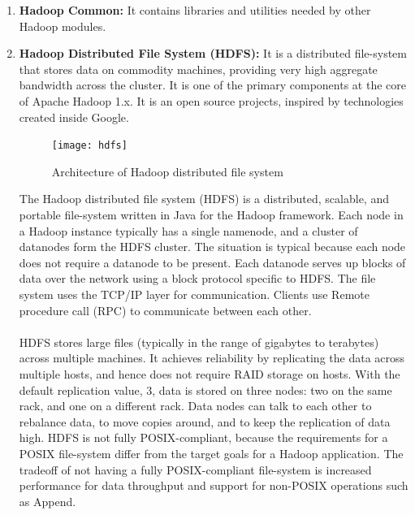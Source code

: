 \documentclass[a4paper,12pt,oneside]{report}
\begin{document}
\begin{enumerate}
        \item \textbf{Hadoop Common:}
                It contains libraries and utilities needed by other Hadoop modules.
        \item \textbf{Hadoop Distributed File System (HDFS):}
                It is a distributed file-system that stores data on commodity machines, providing very high aggregate bandwidth across the cluster.
                It is one of the primary components at the core of Apache Hadoop 1.x. It is an open source projects, inspired by technologies created inside Google.
                \begin{figure}[h!]
                        \centering
                        \texttt{[image: hdfs]}
                        \caption{Architecture of Hadoop distributed file system}
                \end{figure}
                The Hadoop distributed file system (HDFS) is a distributed, scalable, and portable file-system written in 
                Java for the Hadoop framework. Each node in a Hadoop instance typically has a single namenode, and a cluster
                of datanodes form the HDFS cluster. The situation is typical because each node does not require a datanode
                to be present. Each datanode serves up blocks of data over the network using a block protocol specific to
                HDFS. The file system uses the TCP/IP layer for communication. Clients use Remote procedure call (RPC) to
                communicate between each other.\\
                \\
                HDFS stores large files (typically in the range of gigabytes to terabytes) across multiple machines. It achieves reliability by replicating the data across multiple hosts, and hence does not require RAID storage on hosts. With the default replication value, 3, data is stored on three nodes: two on the same rack, and one on a different rack. Data nodes can talk to each other to rebalance data, to move copies around, and to keep the replication of data high. HDFS is not fully POSIX-compliant, because the requirements for a POSIX file-system differ from the target goals for a Hadoop application. The tradeoff of not having a fully POSIX-compliant file-system is increased performance for data throughput and support for non-POSIX operations such as Append.\\
                \\

\end{enumerate}
\end{document}

